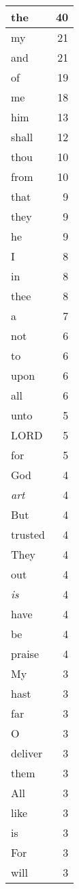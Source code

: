 \begin{center}
\begin{longtable}{l|r}
\hline \hline
\endlastfoot
the & 40 \\ \hline
my & 21 \\ \hline
and & 21 \\ \hline
of & 19 \\ \hline
me & 18 \\ \hline
him & 13 \\ \hline
shall & 12 \\ \hline
thou & 10 \\ \hline
from & 10 \\ \hline
that & 9 \\ \hline
they & 9 \\ \hline
he & 9 \\ \hline
I & 8 \\ \hline
in & 8 \\ \hline
thee & 8 \\ \hline
a & 7 \\ \hline
not & 6 \\ \hline
to & 6 \\ \hline
upon & 6 \\ \hline
all & 6 \\ \hline
unto & 5 \\ \hline
LORD & 5 \\ \hline
for & 5 \\ \hline
God & 4 \\ \hline
\emph{art} & 4 \\ \hline
But & 4 \\ \hline
trusted & 4 \\ \hline
They & 4 \\ \hline
out & 4 \\ \hline
\emph{is} & 4 \\ \hline
have & 4 \\ \hline
be & 4 \\ \hline
praise & 4 \\ \hline
My & 3 \\ \hline
hast & 3 \\ \hline
far & 3 \\ \hline
O & 3 \\ \hline
deliver & 3 \\ \hline
them & 3 \\ \hline
All & 3 \\ \hline
like & 3 \\ \hline
is & 3 \\ \hline
For & 3 \\ \hline
will & 3 \\ \hline

\end{longtable}
\end{center}
